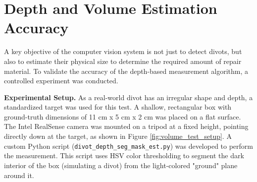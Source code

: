 

\section{Depth and Volume Estimation Accuracy}
\label{sec:volume_evaluation}
A key objective of the computer vision system is not just to detect divots, but also to estimate their physical size to determine the required amount of repair material. To validate the accuracy of the depth-based measurement algorithm, a controlled experiment was conducted.

\textbf{Experimental Setup.}
As a real-world divot has an irregular shape and depth, a standardized target was used for this test. A shallow, rectangular box with ground-truth dimensions of 11 cm x 5 cm x 2 cm was placed on a flat surface. The Intel RealSense camera was mounted on a tripod at a fixed height, pointing directly down at the target, as shown in Figure \ref{fig:volume_test_setup}. A custom Python script (\texttt{divot\_depth\_seg\_mask\_est.py}) was developed to perform the measurement. This script uses HSV color thresholding to segment the dark interior of the box (simulating a divot) from the light-colored "ground" plane around it.

